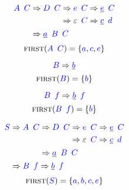 \documentclass{article}
\newcommand{\FIRST}{\textsc{first}}
\newcommand{\Symbol}[1]{\textcolor{blue}{#1}}
\newcommand{\Null}{\varepsilon}
\newcommand{\Derive}{\Rightarrow}
\newcommand{\Seq}{{\ \,}}
\begin{document}
\begin{equation*}
  \Symbol{A} \Seq \Symbol{C} \begin{aligned}[t]
    &\Derive \Symbol{D} \Seq \Symbol{C} \begin{aligned}[t]
      &\Derive \Symbol{e} \Seq \Symbol{C} \Derive \underline{\Symbol{e}} \Seq \Symbol{C} \\
      &\Derive \Null \Seq \Symbol{C} \Derive \underline{\Symbol{c}} \Seq \Symbol{d} \\
    \end{aligned}\\
    &\Derive \underline{\Symbol{a}} \Seq \Symbol{B} \Seq \Symbol{C}
  \end{aligned}
\end{equation*}
\begin{equation*}
  \FIRST(\Symbol{A} \Seq \Symbol{C}) = \{\Symbol{a}, \Symbol{c}, \Symbol{e}\}
\end{equation*}

\begin{equation*}
  \Symbol{B} \Derive \underline{\Symbol{b}}
\end{equation*}
\begin{equation*}
  \FIRST(\Symbol{B}) = \{\Symbol{b}\}
\end{equation*}

\begin{equation*}
  \Symbol{B} \Seq \Symbol{f} \Derive \underline{\Symbol{b}} \Seq \Symbol{f}
\end{equation*}
\begin{equation*}
  \FIRST(\Symbol{B} \Seq \Symbol{f}) = \{\Symbol{b}\}
\end{equation*}

\begin{equation*}
  \Symbol{S} \begin{aligned}[t]
    &\Derive \Symbol{A} \Seq \Symbol{C} \begin{aligned}[t]
      &\Derive \Symbol{D} \Seq \Symbol{C} \begin{aligned}[t]
        &\Derive \Symbol{e} \Seq \Symbol{C} \Derive \underline{\Symbol{e}} \Seq \Symbol{C} \\
        &\Derive \Null \Seq \Symbol{C} \Derive \underline{\Symbol{c}} \Seq \Symbol{d} \\
      \end{aligned}\\
      &\Derive \underline{\Symbol{a}} \Seq \Symbol{B} \Seq \Symbol{C}
    \end{aligned}\\
    &\Derive \Symbol{B} \Seq \Symbol{f} \Derive \underline{\Symbol{b}} \Seq \Symbol{f}
  \end{aligned}
\end{equation*}
\begin{equation*}
  \FIRST(\Symbol{S}) = \{\Symbol{a}, \Symbol{b}, \Symbol{c}, \Symbol{e}\}
\end{equation*}
\end{document}
